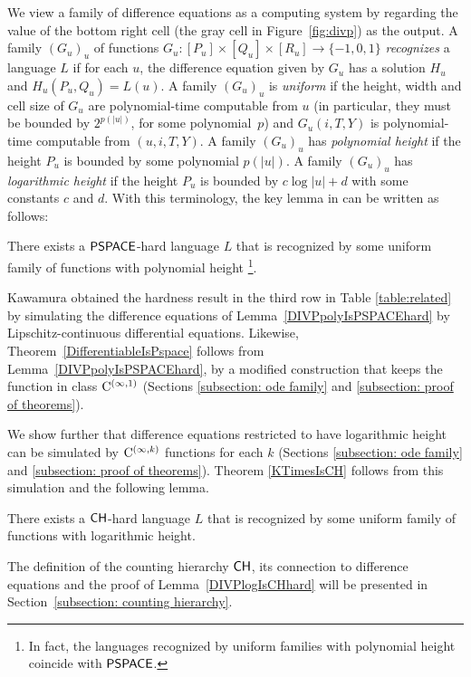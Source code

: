 We view a family of difference equations as a computing system by
regarding the value of the bottom right cell (the gray cell in Figure~\ref{fig:divp}) as the output. 
A family $(G_u)_u$ of functions 
$G_u \colon [P_u] \times [Q_u] \times [R_u] \to \{-1, 0, 1\}$
\emph{recognizes} a language $L$ if for each $u$,
the difference equation given by $G_u$ has a solution $H_u$ 
and $H_u(P_u, Q_u) = L(u)$.
A family $(G_u)_u$ is \emph{uniform} 
if the height, width and cell size of $G_u$ are 
polynomial-time computable from $u$ (in particular, 
they must be bounded by $2^{p(|u|)}$, for some polynomial~$p$)
and $G_u(i, T, Y)$ is polynomial-time computable from $(u, i, T, Y)$.
A family $(G_u)_u$ has \emph{polynomial height} if the height $P_u$ is bounded by some polynomial $p(|u|)$.
A family $(G_u)_u$ has \emph{logarithmic height} if the height $P_u$ is bounded by $c \log |u| + d$ with some constants $c$ and $d$.
With this terminology,
the key lemma in 
\cite[Lemma 4.7]{kawamura2010lipschitz} 
can be written as follows:
\begin{lemma}
 \label{DIVPpolyIsPSPACEhard}
 There exists a $\mathsf{PSPACE}$-hard language $L$ that is recognized by some uniform family of functions with polynomial height%
 \footnote{In fact, the languages recognized by 
 uniform families with polynomial height coincide with $\mathsf{PSPACE}$.
}.
\end{lemma}

Kawamura obtained the hardness result in the third row in Table \ref{table:related} 
by simulating the difference equations of Lemma~\ref{DIVPpolyIsPSPACEhard}
by Lipschitz-continuous differential equations. 
Likewise, 
Theorem~\ref{DifferentiableIsPspace} follows from Lemma~\ref{DIVPpolyIsPSPACEhard},
by a modified construction that keeps 
the function in class $\mathrm C ^{(\infty, 1)}$ 
(Sections \ref{subsection: ode family} and \ref{subsection: proof of theorems}).

We show further that 
difference equations restricted to have logarithmic height can be simulated by
$\mathrm C ^{(\infty, k)}$ functions for each $k$ 
(Sections \ref{subsection: ode family} and \ref{subsection: proof of theorems}).
Theorem \ref{KTimesIsCH} follows from this simulation and the following lemma.
\begin{lemma}
 \label{DIVPlogIsCHhard}
 There exists a $\mathsf{CH}$-hard language $L$ that is recognized by some uniform family of functions with logarithmic height.
\end{lemma}

The definition of the counting hierarchy $\mathsf{CH}$, 
its connection to difference equations and 
the proof of Lemma~\ref{DIVPlogIsCHhard} 
will be presented in Section~\ref{subsection: counting hierarchy}. 



